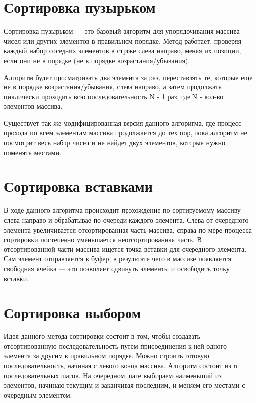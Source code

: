\documentclass[12pt]{report}
\begin{document}
	
	\section{Сортировка пузырьком}
	
	 Сортировка пузырьком — это базовый алгоритм для упорядочивания массива чисел или других элементов в правильном порядке. Метод работает, проверяя каждый набор соседних элементов в строке слева направо, меняя их позиции, если они не в порядке (не в порядке возрастания/убывания). 
	 
	 Алгоритм будет просматривать два элемента за раз, переставлять те, которые еще не в порядке возрастания/убывания, слева направо, а затем продолжать циклически проходить всю последовательность N - 1 раз, где N - кол-во элементов массива. 
	 
	 Существует так же модифицированная версия данного алгоритма, где процесс прохода по всем элементам массива продолжается до тех пор, пока алгоритм не посмотрит весь набор чисел и не найдет двух элементов, которые нужно поменять местами.
	
	\section{Сортировка вставками}
	
	В ходе данного алгоритма происходит прохождение по сортируемому массиву слева направо и обрабатывае по очереди каждого элемента. Слева от очередного элемента увеличивается отсортированная часть массива, справа по мере процесса сортировки постепенно уменьшается неотсортированная часть. В отсортированной части массива ищется точка вставки для очередного элемента. Сам элемент отправляется в буфер, в результате чего в массиве появляется свободная ячейка — это позволяет сдвинуть элементы и освободить точку вставки.
	
	\section{Сортировка выбором}
	
	Идея данного метода сортировки состоит в том, чтобы создавать отсортированную последовательность путем присоединения к ней одного элемента за другим в правильном порядке. Можно строить готовую последовательность, начиная с левого конца массива. Алгоритм состоит из n последовательных шагов. На очередном шаге выбираем наименьший из элементов, начинаю текущим и заканчивая последним, и меняем его местами с очередным элементом.
	
\end{document}

